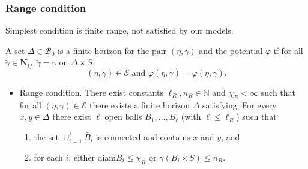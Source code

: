 \documentclass[c, 10pt]{beamer}
\begin{document}
\begin{frame}\frametitle{Range condition}

	Simplest condition is \alert{finite range}, not satisfied by our models. \newline


	A set $\Delta \in \mathcal B_0$ is a \alert{finite horizon} for the pair $(\eta,\gamma)$ and the potential $\varphi$ if for all $\tilde{\gamma} \in \mathbf N_{lf}, \tilde{\gamma} = \gamma$ on $\Delta\times S$ 
$$(\eta,\tilde{\gamma})\in\mathcal E \text{ and } \varphi(\eta,\tilde{\gamma}) = \varphi(\eta,\gamma). $$

\begin{itemize}
	\item \alert{Range condition}. There exist constants $\ell_R,n_R \in \mathbb N$ and $\chi_R < \infty$ such that for all $(\eta,\gamma) \in \mathcal E$ there exists a finite horizon $\Delta$ satisfying: For every $x,y \in \Delta$ there exist $\ell$ open balls $B_1, \dots, B_\ell$ (with $\ell \leq \ell_R$) such that
	\begin{enumerate}[-]
		\item the set $\cup^\ell_{i=1} \bar B_i$ is connected and contains $x$ and $y$, and 
		\item for each $i$, either $\text{diam} B_i \leq \chi_R$ or $\gamma(B_i\times S) \leq n_R$.
	\end{enumerate}
\end{itemize}
\end{frame}
\end{document}
